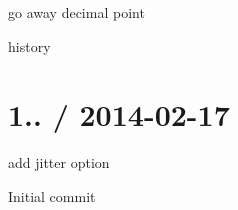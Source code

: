 
\begin{DoxyItemize}
\item go away decimal point
\item history
\end{DoxyItemize}

\section*{1.. / 2014-\/02-\/17 }


\begin{DoxyItemize}
\item add jitter option
\item Initial commit 
\end{DoxyItemize}